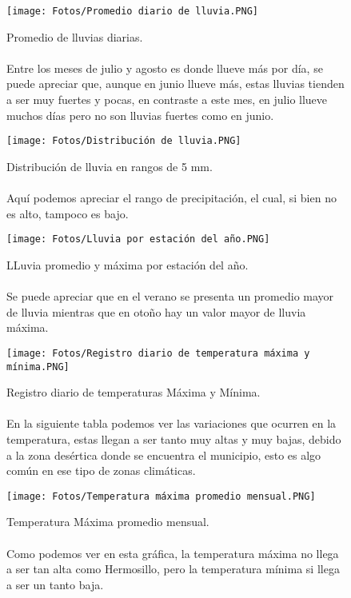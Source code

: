 \documentclass{article}
\begin{document}
\begin{figure}[H]
    \centering
    \texttt{[image: Fotos/Promedio diario de lluvia.PNG]}
    \caption{Promedio de lluvias diarias.\\
    \\
    Entre los meses de julio y agosto es donde llueve más por día, se puede apreciar que, aunque en junio llueve más, estas lluvias tienden a ser muy fuertes y pocas, en contraste a este mes, en julio llueve muchos días pero no son lluvias fuertes como en junio.}
\end{figure}

\begin{figure}[H]
    \centering
    \texttt{[image: Fotos/Distribución de lluvia.PNG]}
    \caption{Distribución de lluvia en rangos de 5 mm.\\
    \\
    Aquí podemos apreciar el rango de precipitación, el cual, si bien no es alto, tampoco es bajo.}
\end{figure}

\begin{figure}[H]
    \centering
    \texttt{[image: Fotos/Lluvia por estación del año.PNG]}
    \caption{LLuvia promedio y máxima por estación del año.\\
    \\
    Se puede apreciar que en el verano se presenta un promedio mayor de lluvia mientras que en otoño hay un valor mayor de lluvia máxima.}
\end{figure}

\begin{figure}[H]
    \centering
    \texttt{[image: Fotos/Registro diario de temperatura máxima y mínima.PNG]}
    \caption{Registro diario de temperaturas Máxima y Mínima.\\
    \\
    En la siguiente tabla podemos ver las variaciones que ocurren en la temperatura, estas llegan a ser tanto muy altas y muy bajas, debido a la zona desértica donde se encuentra el municipio, esto es algo común en ese tipo de zonas climáticas.}
\end{figure}

\begin{figure}[H]
    \centering
    \texttt{[image: Fotos/Temperatura máxima promedio mensual.PNG]}
    \caption{Temperatura Máxima promedio mensual.\\
    \\
    Como podemos ver en esta gráfica, la temperatura máxima no llega a ser tan alta como Hermosillo, pero la temperatura mínima si llega a ser un tanto baja.}
\end{figure}
\end{document}
